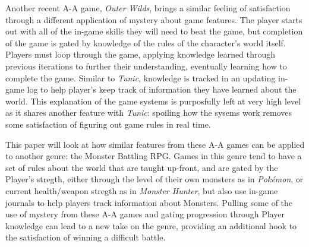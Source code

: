 Another recent \ac{A-A} game, \textit{Outer Wilds}, brings a similar feeling of satisfaction through a different application of mystery about game features. The player starts out with all of the in-game skills they will need to beat the game, but completion of the game is gated by knowledge of the rules of the character's world itself. Players must loop through the game, applying knowledge learned through previous iterations to further their understanding, eventually learning how to complete the game. Similar to \textit{Tunic}, knowledge is tracked in an updating in-game log to help player's keep track of information they have learned about the world. This explanation of the game systems is purposfully left at very high level as it shares another feature with \textit{Tunic}: spoiling how the sysems work removes some satisfaction of figuring out game rules in real time.

This paper will look at how similar features from these \ac{A-A} games can be applied to another genre: the Monster Battling \ac{RPG}. Games in this genre tend to have a set of rules about the world that are taught up-front, and are gated by the Player's stregth, either through the level of their own monsters as in \textit{Pok\'emon}, or current health/weapon stregth as in \textit{Monster Hunter}, but also use in-game journals to help players track information about Monsters. Pulling some of the use of mystery from these \ac{A-A} games and gating progression through Player knowledge can lead to a new take on the genre, providing an additional hook to the satisfaction of winning a difficult battle.
